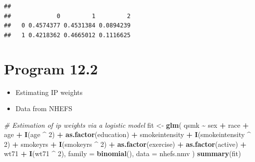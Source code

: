 \documentclass[
  10pt,
]{book}
\newenvironment{Shaded}{\begin{snugshade}}{\end{snugshade}}
\newcommand{\CommentTok}[1]{\textcolor[rgb]{0.56,0.35,0.01}{\textit{#1}}}
\newcommand{\DataTypeTok}[1]{\textcolor[rgb]{0.13,0.29,0.53}{#1}}
\newcommand{\DecValTok}[1]{\textcolor[rgb]{0.00,0.00,0.81}{#1}}
\newcommand{\KeywordTok}[1]{\textcolor[rgb]{0.13,0.29,0.53}{\textbf{#1}}}
\newcommand{\NormalTok}[1]{#1}
\newcommand{\OperatorTok}[1]{\textcolor[rgb]{0.81,0.36,0.00}{\textbf{#1}}}
\newcommand{\StringTok}[1]{\textcolor[rgb]{0.31,0.60,0.02}{#1}}
\providecommand{\tightlist}{%
  \setlength{\itemsep}{0pt}\setlength{\parskip}{0pt}}
\begin{document}
\begin{verbatim}
##    
##             0         1         2
##   0 0.4574377 0.4531384 0.0894239
##   1 0.4218362 0.4665012 0.1116625
\end{verbatim}

\hypertarget{program-12.2}{%
\section{Program 12.2}\label{program-12.2}}

\begin{itemize}
\tightlist
\item
  Estimating IP weights
\item
  Data from NHEFS
\end{itemize}

\begin{Shaded}
\begin{Highlighting}[]
\CommentTok{\# Estimation of ip weights via a logistic model}
\NormalTok{fit \textless{}{-}}\StringTok{ }\KeywordTok{glm}\NormalTok{(}
\NormalTok{  qsmk }\OperatorTok{\textasciitilde{}}\StringTok{ }\NormalTok{sex }\OperatorTok{+}\StringTok{ }\NormalTok{race }\OperatorTok{+}\StringTok{ }\NormalTok{age }\OperatorTok{+}\StringTok{ }\KeywordTok{I}\NormalTok{(age }\OperatorTok{\^{}}\StringTok{ }\DecValTok{2}\NormalTok{) }\OperatorTok{+}
\StringTok{    }\KeywordTok{as.factor}\NormalTok{(education) }\OperatorTok{+}\StringTok{ }\NormalTok{smokeintensity }\OperatorTok{+}
\StringTok{    }\KeywordTok{I}\NormalTok{(smokeintensity }\OperatorTok{\^{}}\StringTok{ }\DecValTok{2}\NormalTok{) }\OperatorTok{+}\StringTok{ }\NormalTok{smokeyrs }\OperatorTok{+}\StringTok{ }\KeywordTok{I}\NormalTok{(smokeyrs }\OperatorTok{\^{}}\StringTok{ }\DecValTok{2}\NormalTok{) }\OperatorTok{+}
\StringTok{    }\KeywordTok{as.factor}\NormalTok{(exercise) }\OperatorTok{+}\StringTok{ }\KeywordTok{as.factor}\NormalTok{(active) }\OperatorTok{+}\StringTok{ }\NormalTok{wt71 }\OperatorTok{+}\StringTok{ }\KeywordTok{I}\NormalTok{(wt71 }\OperatorTok{\^{}}\StringTok{ }\DecValTok{2}\NormalTok{),}
  \DataTypeTok{family =} \KeywordTok{binomial}\NormalTok{(),}
  \DataTypeTok{data =}\NormalTok{ nhefs.nmv}
\NormalTok{)}
\KeywordTok{summary}\NormalTok{(fit)}
\end{Highlighting}
\end{Shaded}
\end{document}
